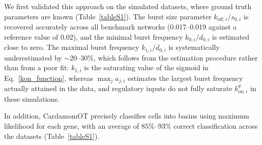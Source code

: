\documentclass[a4paper, 11pt]{article}
\theoremstyle{plain}
\theoremstyle{remark}
\newcommand*{\firstreview}[1]{{\color{black}#1}}
\begin{document}
We first validated this approach on the simulated datasets, where ground truth parameters are
known (Table~\ref{tableS1}). \firstreview{The burst size parameter $k_{\mathrm{off},i}/s_{0,i}$
is recovered accurately across all benchmark networks (0.017--0.019 against a reference value of
0.02), and the minimal burst frequency $k_{0,i}/d_{0,i}$ is estimated close to zero. The maximal
burst frequency $k_{1,i}/d_{0,i}$ is systematically underestimated by $\sim$20--30\%, which
follows from the estimation procedure rather than from a poor fit: $k_{1,i}$ is the saturating
value of the sigmoid in Eq.~\eqref{kon_function}, whereas $\max_j a_{j,i}$ estimates the largest
burst frequency actually attained in the data, and regulatory inputs do not fully saturate
$k^{\theta}_{\mathrm{on},i}$ in these simulations.}

In addition, CardamomOT precisely classifies cells into basins using maximum likelihood for each
gene, with an average of $85\%$--$93\%$ correct classification across the datasets
(Table~\ref{tableS1}).
\end{document}
